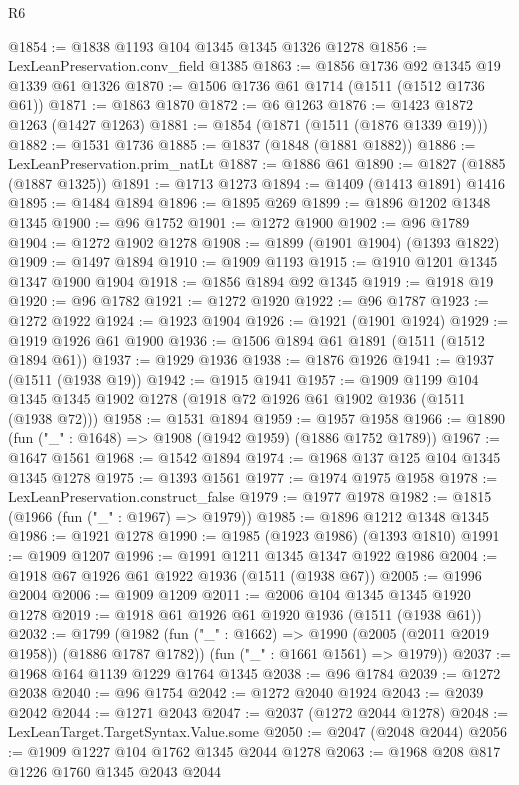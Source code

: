\begin{lexlean}{R6}
\begin{coremodule}
@1854 := @1838 @1193 @104 @1345 @1345 @1326 @1278
@1856 := LexLeanPreservation.conv_field @1385
@1863 := @1856 @1736 @92 @1345 @19 @1339 @61 @1326
@1870 := @1506 @1736 @61 @1714 (@1511 (@1512 @1736 @61))
@1871 := @1863 @1870
@1872 := @6 @1263
@1876 := @1423 @1872 @1263 (@1427 @1263)
@1881 := @1854 (@1871 (@1511 (@1876 @1339 @19)))
@1882 := @1531 @1736
@1885 := @1837 (@1848 (@1881 @1882))
@1886 := LexLeanPreservation.prim_natLt
@1887 := @1886 @61
@1890 := @1827 (@1885 (@1887 @1325))
@1891 := @1713 @1273
@1894 := @1409 (@1413 @1891) @1416
@1895 := @1484 @1894
@1896 := @1895 @269
@1899 := @1896 @1202 @1348 @1345
@1900 := @96 @1752
@1901 := @1272 @1900
@1902 := @96 @1789
@1904 := @1272 @1902 @1278
@1908 := @1899 (@1901 @1904) (@1393 @1822)
@1909 := @1497 @1894
@1910 := @1909 @1193
@1915 := @1910 @1201 @1345 @1347 @1900 @1904
@1918 := @1856 @1894 @92 @1345
@1919 := @1918 @19
@1920 := @96 @1782
@1921 := @1272 @1920
@1922 := @96 @1787
@1923 := @1272 @1922
@1924 := @1923 @1904
@1926 := @1921 (@1901 @1924)
@1929 := @1919 @1926 @61 @1900
@1936 := @1506 @1894 @61 @1891 (@1511 (@1512 @1894 @61))
@1937 := @1929 @1936
@1938 := @1876 @1926
@1941 := @1937 (@1511 (@1938 @19))
@1942 := @1915 @1941
@1957 := @1909
    @1199
    @104
    @1345
    @1345
    @1902
    @1278
    (@1918 @72 @1926 @61 @1902 @1936 (@1511 (@1938 @72)))
@1958 := @1531 @1894
@1959 := @1957 @1958
@1966 := @1890 (fun ("_" : @1648) => @1908 (@1942 @1959) (@1886 @1752 @1789))
@1967 := @1647 @1561
@1968 := @1542 @1894
@1974 := @1968 @137 @125 @104 @1345 @1345 @1278
@1975 := @1393 @1561
@1977 := @1974 @1975 @1958
@1978 := LexLeanPreservation.construct_false
@1979 := @1977 @1978
@1982 := @1815 (@1966 (fun ("_" : @1967) => @1979))
@1985 := @1896 @1212 @1348 @1345
@1986 := @1921 @1278
@1990 := @1985 (@1923 @1986) (@1393 @1810)
@1991 := @1909 @1207
@1996 := @1991 @1211 @1345 @1347 @1922 @1986
@2004 := @1918 @67 @1926 @61 @1922 @1936 (@1511 (@1938 @67))
@2005 := @1996 @2004
@2006 := @1909 @1209
@2011 := @2006 @104 @1345 @1345 @1920 @1278
@2019 := @1918 @61 @1926 @61 @1920 @1936 (@1511 (@1938 @61))
@2032 := @1799
    (@1982
      (fun ("_" : @1662) => @1990 (@2005 (@2011 @2019 @1958)) (@1886 @1787 @1782))
      (fun ("_" : @1661 @1561) => @1979))
@2037 := @1968 @164 @1139 @1229 @1764 @1345
@2038 := @96 @1784
@2039 := @1272 @2038
@2040 := @96 @1754
@2042 := @1272 @2040 @1924
@2043 := @2039 @2042
@2044 := @1271 @2043
@2047 := @2037 (@1272 @2044 @1278)
@2048 := LexLeanTarget.TargetSyntax.Value.some
@2050 := @2047 (@2048 @2044)
@2056 := @1909 @1227 @104 @1762 @1345 @2044 @1278
@2063 := @1968 @208 @817 @1226 @1760 @1345 @2043 @2044

\end{coremodule}
\end{lexlean}
